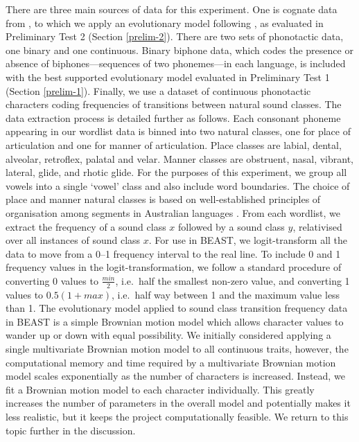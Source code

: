 There are three main sources of data for this experiment. One is cognate data from \textcite{bouckaert_origin_2018}, to which we apply an evolutionary model following \textcite{bouckaert_origin_2018}, as evaluated in Preliminary Test 2 (Section \ref{prelim-2}). There are two sets of phonotactic data, one binary and one continuous. Binary biphone data, which codes the presence or absence of biphones---sequences of two phonemes---in each language, is included with the best supported evolutionary model evaluated in Preliminary Test 1 (Section \ref{prelim-1}). Finally, we use a dataset of continuous phonotactic characters coding frequencies of transitions between natural sound classes. The data extraction process is detailed further as follows. Each consonant phoneme appearing in our wordlist data is binned into two natural classes, one for place of articulation and one for manner of articulation. Place classes are labial, dental, alveolar, retroflex, palatal and velar. Manner classes are obstruent, nasal, vibrant, lateral, glide, and rhotic glide. For the purposes of this experiment, we group all vowels into a single `vowel' class and also include word boundaries. The choice of place and manner natural classes is based on well-established principles of organisation among segments in Australian languages \autocites{dixon_languages_1980}{hamilton_phonetic_1996}{baker_word_2014}{round_segment_2021}{round_phonotactics_2021}. From each wordlist, we extract the frequency of a sound class \(x\) followed by a sound class \(y\), relativised over all instances of sound class \(x\). For use in BEAST, we logit-transform all the data to move from a 0--1 frequency interval to the real line. To include 0 and 1 frequency values in the logit-transformation, we follow a standard procedure of converting 0 values to \(\frac{min}{2}\), i.e.~half the smallest non-zero value, and converting 1 values to \(0.5 (1 + max)\), i.e.~half way between 1 and the maximum value less than 1. The evolutionary model applied to sound class transition frequency data in BEAST is a simple Brownian motion model which allows character values to wander up or down with equal possibility. We initially considered applying a single multivariate Brownian motion model to all continuous traits, however, the computational memory and time required by a multivariate Brownian motion model scales exponentially as the number of characters is increased. Instead, we fit a Brownian motion model to each character individually. This greatly increases the number of parameters in the overall model and potentially makes it less realistic, but it keeps the project computationally feasible. We return to this topic further in the discussion.

